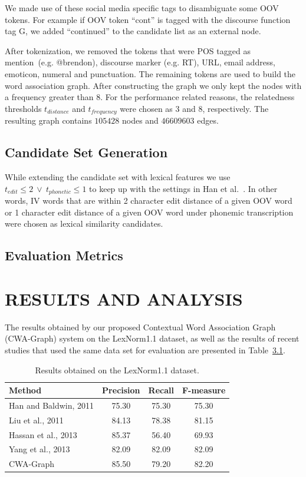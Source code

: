 \documentclass[a4paper,onesided,12pt]{report}
\begin{document}
We made use of these social media specific tags to disambiguate some OOV tokens. For example if OOV token ``cont'' is tagged with the discourse function tag G, we added ``continued'' to the candidate list as an external node.

After tokenization, we removed the tokens that were POS tagged as mention~(e.g. @brendon), discourse marker (e.g. RT), URL, email address, emoticon, numeral and punctuation. The remaining tokens are used to build the word association graph. After constructing the graph we only kept the nodes with a frequency greater than $8$. For the performance related reasons, the relatedness thresholds $t_{distance}$ and $t_{frequency}$  were chosen as $3$ and $8$, respectively. The resulting graph contains $105428$ nodes and $46609603$ edges.

\section{Candidate Set Generation}

While extending the candidate set with lexical features we use ${t_{edit}\leq 2}~\vee~{t_{phonetic} \leq 1}$ to keep up with the settings in Han et al.~\cite{Han:2011:LNS:2002472.2002520}. In other words, IV words that are within 2 character edit distance of a given OOV word or 1 character edit distance of a given OOV word under phonemic transcription were chosen as lexical similarity candidates.

\section{Evaluation Metrics}

\chapter{RESULTS AND ANALYSIS}

The results obtained by our proposed Contextual Word Association Graph (CWA-Graph) system on the LexNorm1.1 dataset,
as well as the results of recent studies that used the same data set for evaluation are presented in Table~\ref{tab:results}.

\begin{table}[thb]
  \caption{Results obtained on the LexNorm1.1 dataset.}
  \centering
  \begin{tabular}[t]{lccc}
    \hline
    Method & Precision & Recall & F-measure \\
    \hline
    Han and Baldwin, 2011 & 75.30 & 75.30 & 75.30 \\
    Liu et al., 2011 & 84.13 & 78.38 & 81.15 \\
    Hassan et al., 2013 & 85.37 & 56.40 & 69.93 \\
    Yang et al., 2013 & 82.09 & 82.09 & 82.09 \\
    CWA-Graph   & 85.50 & 79.20 & 82.20 \\
    \hline
  \end{tabular}
  \label{tab:results}
\end{table}
\end{document}
